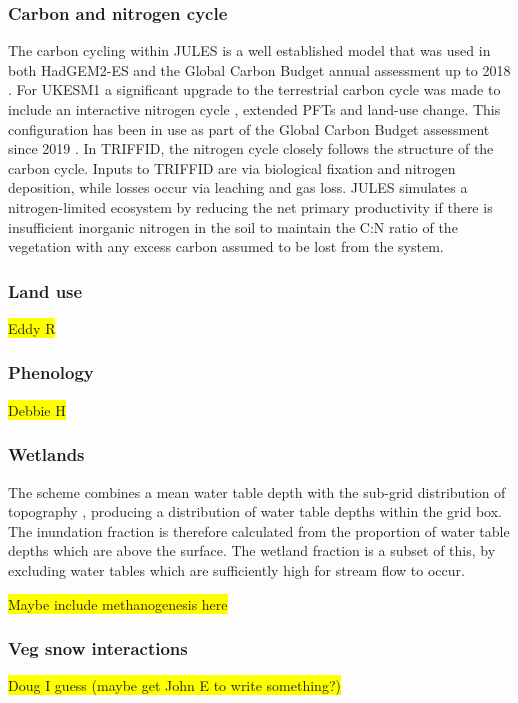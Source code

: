 \documentclass[bg, manuscript]{copernicus}
\newcommand{\hilight}[1]{\colorbox{yellow}{#1}}
\begin{document}
\subsubsection{Carbon and nitrogen cycle}
The carbon cycling within JULES is a well established model that was used in both HadGEM2-ES \citep{collins2011development} and the Global Carbon Budget annual assessment up to 2018 \citep{le2018global}. For UKESM1 a significant upgrade to the terrestrial carbon cycle was made \citep{Sellar2019-bo} to include an interactive nitrogen cycle \citep{wiltshire2020jules}, extended PFTs \cite{harper2016improved} and land-use change. This configuration has been in use as part of the Global Carbon Budget assessment since 2019 \citep{essd-11-1783-2019}. In TRIFFID, the nitrogen cycle closely follows the structure of the carbon cycle. Inputs to TRIFFID are via biological fixation and nitrogen deposition, while losses occur via leaching and gas loss. JULES simulates a nitrogen-limited ecosystem by reducing the net primary productivity if there is insufficient inorganic nitrogen in the soil to maintain the C:N ratio of the vegetation with any excess carbon assumed to be lost from the system.\\

\subsubsection{Land use}
\hilight{Eddy R}

\subsubsection{Phenology}
\hilight{Debbie H}

\subsubsection{Wetlands}
The scheme combines a mean water table depth with the sub-grid distribution of topography \citep{Gedney2019}, producing a distribution of water table depths within the grid box. The inundation fraction is therefore calculated from the proportion of water table depths which are above the surface. The wetland fraction is a subset of this, by excluding water tables which are sufficiently high for stream flow to occur.

\hilight{Maybe include methanogenesis here}


\subsubsection{Veg snow interactions}
\hilight{Doug I guess (maybe get John E to write something?)}
\end{document}
